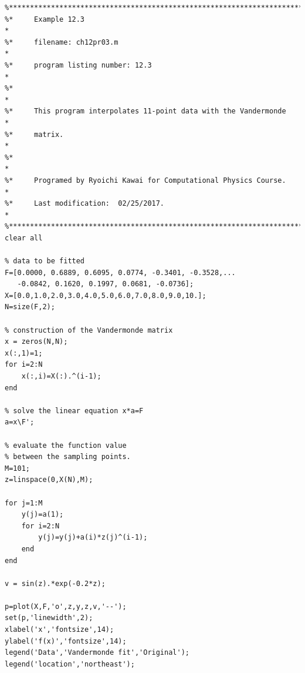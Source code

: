 \bigskip
\noindent
\program
\label{prog:vandermonde}
\footnotesize
\begin{verbatim}
%**************************************************************************
%*     Example 12.3                                                       *
%*     filename: ch12pr03.m                                               *
%*     program listing number: 12.3                                       *
%*                                                                        *
%*     This program interpolates 11-point data with the Vandermonde       *
%*     matrix.                                                            *
%*                                                                        *
%*     Programed by Ryoichi Kawai for Computational Physics Course.       *
%*     Last modification:  02/25/2017.                                    *
%**************************************************************************
clear all

% data to be fitted
F=[0.0000, 0.6889, 0.6095, 0.0774, -0.3401, -0.3528,...
   -0.0842, 0.1620, 0.1997, 0.0681, -0.0736];
X=[0.0,1.0,2.0,3.0,4.0,5.0,6.0,7.0,8.0,9.0,10.];
N=size(F,2);

% construction of the Vandermonde matrix
x = zeros(N,N);
x(:,1)=1;
for i=2:N
    x(:,i)=X(:).^(i-1);
end

% solve the linear equation x*a=F
a=x\F';

% evaluate the function value
% between the sampling points.
M=101;
z=linspace(0,X(N),M);

for j=1:M
    y(j)=a(1);
    for i=2:N
        y(j)=y(j)+a(i)*z(j)^(i-1);
    end
end

v = sin(z).*exp(-0.2*z);

p=plot(X,F,'o',z,y,z,v,'--');
set(p,'linewidth',2);
xlabel('x','fontsize',14);
ylabel('f(x)','fontsize',14);
legend('Data','Vandermonde fit','Original');
legend('location','northeast');
\end{verbatim}
\normalsize

